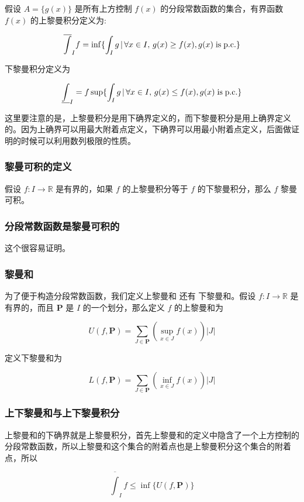 假设 $A = \{ g(x) \}$ 是所有上方控制 $f(x)$ 的分段常数函数的集合，有界函数 $f(x)$ 的上黎曼积分定义为:

\[
   \overline{\int}_I f =  \inf \{ \int_{I} g \,\vert\, \forall x \in I ,\, g(x) \ge f(x), g(x) \mathrm{\; is\; p.c.} \}
\]

下黎曼积分定义为

\[
    \underline{\int}_I = f\sup \{ \int_{I} g \,\vert\, \forall x \in I ,\, g(x) \le f(x), g(x) \mathrm{\; is\; p.c.} \}
\]

这里要注意的是，上黎曼积分是用下确界定义的，而下黎曼积分是用上确界定义的。因为上确界可以用最大附着点定义，下确界可以用最小附着点定义，后面做证明的时候可以利用数列极限的性质。


\subsubsection{黎曼可积的定义}

假设 $f: I \to \mathbb{R}$ 是有界的，如果 $f$ 的上黎曼积分等于 $f$ 的下黎曼积分，那么 $f$ 黎曼可积。


\subsubsection{分段常数函数是黎曼可积的}

这个很容易证明。


\subsubsection{黎曼和}

为了便于构造分段常数函数，我们定义上黎曼和 还有 下黎曼和。假设 $f: I \to \mathbb{R}$ 是有界的，而且 $\mathbf{P}$ 是 $I$ 的一个划分，那么定义 $f$ 的上黎曼和为

\[
    U(f, \mathbf{P}) = \sum_{J \in \mathbf{P}} (\sup_{x \in J}f(x)) \lvert J \rvert
\]

定义下黎曼和为

\[
    L(f, \mathbf{P}) = \sum_{J \in \mathbf{P}} (\inf_{x \in J}f(x)) \lvert J \rvert
\]

\subsubsection{上下黎曼和与上下黎曼积分}

上黎曼和的下确界就是上黎曼积分，首先上黎曼和的定义中隐含了一个上方控制的分段常数函数，所以上黎曼和这个集合的附着点也是上黎曼积分这个集合的附着点，所以

\[
    \overline{\int}_I f \le \inf \{ U(f, \mathbf{P}) \}
\]

